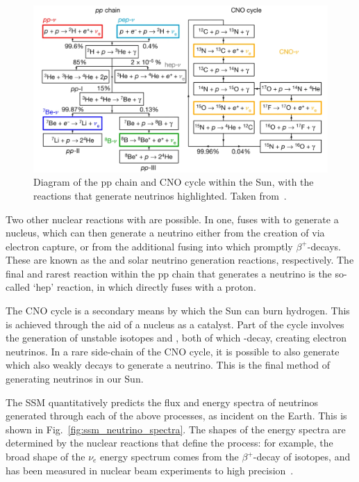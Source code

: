 \begin{figure}
    \centering
    \includegraphics[width=\textwidth]{1_NeutrinoTheory/Figs/solar_nu_chains_diagram.png}
    \caption[Diagram of the pp chain and CNO cycle within the Sun]
    {Diagram of the pp chain and CNO cycle within the Sun, with the reactions that generate neutrinos highlighted. Taken from~\cite{agostiniComprehensiveMeasurementPpchain2018}.}
    \label{fig:solar_nu_chains}
\end{figure}

Two other nuclear reactions with  are possible. In one,  fuses with  to generate a  nucleus, which can then generate a neutrino either from the creation of  via electron capture, or from the additional fusing into \beight{} which promptly $\beta^{+}$-decays. These are known as the  and \beight{} solar neutrino generation reactions, respectively. The final and rarest reaction within the pp chain that generates a neutrino is the so-called `hep' reaction, in which  directly fuses with a proton.

The CNO cycle is a secondary means by which the Sun can burn hydrogen. This is achieved through the aid of a  nucleus as a catalyst. Part of the cycle involves the generation of unstable isotopes  and , both of which \ce{\beta^{+}}-decay, creating electron neutrinos. In a rare side-chain of the CNO cycle, it is possible to also generate  which also weakly decays to generate a neutrino. This is the final method of generating neutrinos in our Sun.

The SSM quantitatively predicts the flux and energy spectra of neutrinos generated through each of the above processes, as incident on the Earth. This is shown in Fig.~\ref{fig:ssm_neutrino_spectra}. The shapes of the energy spectra are determined by the nuclear reactions that define the process: for example, the broad shape of the \beight{} $\nu_{e}$ energy spectrum comes from the $\beta^{+}$-decay of \beight{} isotopes, and has been measured in nuclear beam experiments to high precision~\cite{winterB8NeutrinoSpectrum2006}. %

